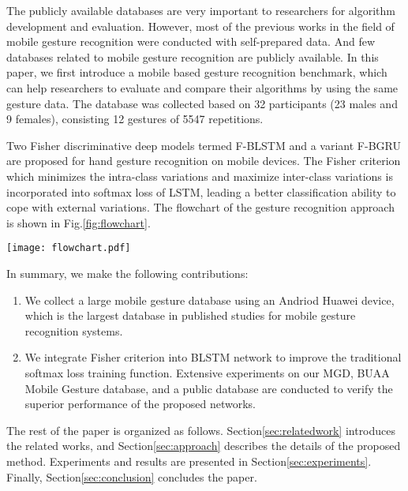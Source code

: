 \documentclass[review]{elsarticle}
\begin{document}
The publicly available databases are very important to researchers for algorithm development and evaluation. However, most of the previous works in the field of mobile gesture recognition were conducted with self-prepared data. And few databases related to mobile gesture recognition are publicly available. In this paper, we first introduce a mobile based gesture recognition benchmark, which can help researchers to evaluate and compare their algorithms by using the same gesture data. The database was collected based on 32 participants (23 males and 9 females), consisting 12 gestures of 5547 repetitions.

Two Fisher discriminative deep models termed F-BLSTM and a variant F-BGRU are proposed for hand gesture recognition on mobile devices.
The Fisher criterion which minimizes the {intra-class variations and maximize inter-class variations} is incorporated into softmax loss of LSTM, leading a better classification ability to cope with external variations. The flowchart of the gesture recognition approach is shown in Fig.\;\ref{fig:flowchart}.


\begin{figure*}[t]
	\normalsize
	\centering
	\texttt{[image: flowchart.pdf]}
	\caption{Flowchart of the gesture recognition system. We introduce Fisher criterion into BLSTM network to improve the traditional softmax loss training function, which is able to minimize the intra-class variations and maximize the inter-class variations in the deep framework. }
	\label{fig:flowchart}\end{figure*}

In summary, we make the following contributions:

\begin{enumerate}[1.]
	\item We collect a large mobile gesture database using an Andriod {Huawei} device, which is the largest database in published studies for mobile gesture recognition systems.
	\item We integrate Fisher criterion into BLSTM network to improve the traditional softmax loss training function. Extensive experiments on our {MGD, BUAA Mobile Gesture database,} and a public database are conducted to verify the superior performance of the proposed networks.
\end{enumerate}

The rest of the paper is organized as follows. Section\;\ref{sec:relatedwork} introduces the related works, and Section\;\ref{sec:approach} describes the details of the proposed method. Experiments and results are presented in Section\;\ref{sec:experiments}. Finally, Section\;\ref{sec:conclusion} concludes the paper.
\end{document}
